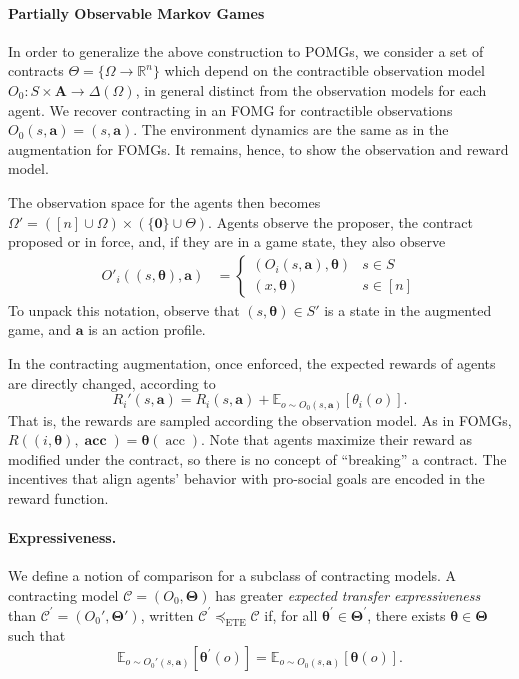 \documentclass[referee,sn-basic]{sn-jnl}
\newcommand{\R}{\mathbb{R}}
\newcommand{\E}{\mathbb{E}}
\newcommand{\bld}[1]{\boldsymbol{#1}}
\newcommand{\btheta}{\boldsymbol{\theta}}
\theoremstyle{thmstyleone}%
\theoremstyle{thmstyletwo}%
\theoremstyle{thmstylethree}%
\begin{document}
\paragraph{Partially Observable Markov Games} In order to generalize the above construction to POMGs, we consider a set of contracts $\Theta = \{ \Omega \to \R^n \}$ which depend on the contractible observation model $O_0: S \times \mathbf A \to \Delta (\Omega)$, in general distinct from the observation models for each agent. We recover contracting in an FOMG for contractible observations $O_0 (s,\mathbf a ) = (s, \mathbf a)$. The environment dynamics are the same as in the augmentation for FOMGs. It remains, hence, to show the observation and reward model.

The observation space for the agents then becomes $\Omega'= ([n] \cup \Omega) \times (\{\boldsymbol{0}\} \cup \Theta)$. Agents observe the proposer, the contract proposed or in force, and, if they are in a game state, they also observe 
\begin{align*}
    O'_i( (s, \boldsymbol\theta), \mathbf a) &= \begin{cases} (O_i(s, \mathbf a), \boldsymbol\theta) & s \in S  \\ (x, \boldsymbol\theta) & s \in [n]   \end{cases}
\end{align*}
To unpack this notation, observe that $(s, \boldsymbol\theta) \in S'$ is a state in the augmented game, and $\mathbf a$ is an action profile.

In the contracting augmentation, once enforced, the expected rewards of agents are directly changed, according to 
\[
R_i'(s,\mathbf a) = R_i(s,\mathbf a) + \E_{o \sim O_0 (s, \mathbf a)} [\theta_i (o)].
\]
That is, the rewards are sampled according the observation model. As in FOMGs, $R( (i, \btheta), \mathbf{\operatorname{acc}}) = \btheta(\operatorname{acc})$. Note that agents maximize their reward as modified under the contract, so there is no concept of \enquote{breaking} a contract. The incentives that align agents' behavior with pro-social goals are encoded in the reward function. 

\paragraph{Expressiveness.} We define a notion of comparison for a subclass of contracting models. A contracting model $\mathcal{C} = (O_0, \bld{\Theta})$ has greater \emph{expected transfer expressiveness} than $\mathcal{C}^\prime = (O_0', \bld{\Theta'})$, written $\mathcal{C}^\prime \preceq_{\text{ETE}} \mathcal{C}$ if, for all $\bld{\theta^\prime} \in \bld{\Theta^\prime}$, there exists $\bld{\theta} \in \bld{\Theta}$ such that
    \begin{equation}
    \mathbb{E}_{o \sim O_0'(s, \mathbf a)}[\bld{\theta^\prime}(o)] = \mathbb{E}_{o \sim O_0(s, \mathbf a)}[\bld{\theta}(o)]. \label{eq:expressiveness}
    \end{equation}
\end{document}
